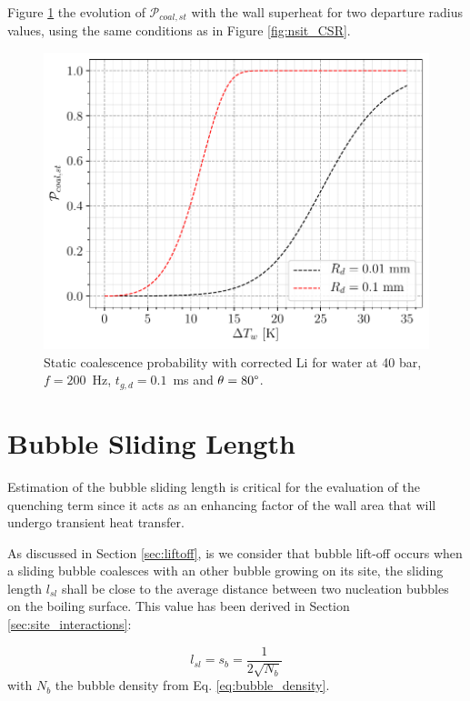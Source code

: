 Figure \ref{fig:pcoal_st} the evolution of $\mathcal{P}_{coal,st}$ with the wall superheat for two departure radius values, using the same conditions as in Figure \ref{fig:nsit_CSR}.

\begin{figure}[!h]
\centering
\includegraphics[width=0.6\linewidth]{img/site_interaction/P_coal_st.pdf}
\caption{Static coalescence probability with corrected Li \etal for water at 40 bar, $f=200$~Hz, $t_{g,d} = 0.1$~ms and $\theta=80\degree$.}
\label{fig:pcoal_st}
\end{figure}











\section{Bubble Sliding Length}

Estimation of the bubble sliding length is critical for the evaluation of the quenching term since it acts as an enhancing factor of the wall area that will undergo transient heat transfer.

\npar

As discussed in Section \ref{sec:liftoff}, is we consider that bubble lift-off occurs when a sliding bubble coalesces with an other bubble growing on its site, the sliding length $l_{sl}$ shall be close to the average distance between two nucleation bubbles on the boiling surface. This value has been derived in Section \ref{sec:site_interactions}:

\begin{equation}
l_{sl} = s_{b} = \frac{1}{2\sqrt{N_{b}}}
\label{eq:sliding_length}
\end{equation}
with $N_{b}$ the bubble density from Eq. \ref{eq:bubble_density}.

